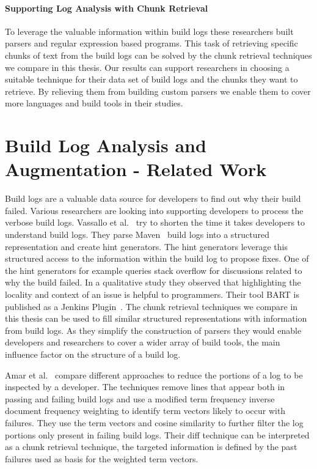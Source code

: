 \documentclass[\myrootdir/main.tex]{subfiles}
\begin{document}
\paragraph{Supporting Log Analysis with Chunk Retrieval}
To leverage the valuable information within build logs these researchers built parsers and regular expression based programs.
This task of retrieving specific chunks of text from the build logs can be solved by the chunk retrieval techniques we compare in this thesis.
Our results can support researchers in choosing a suitable technique for their data set of build logs and the chunks they want to retrieve.
By relieving them from building custom parsers we enable them to cover more languages and build tools in their studies.

\section{Build Log Analysis and Augmentation - Related Work}
\label{sec:rw-bl-analysis}
Build logs are a valuable data source for developers to find out why their build failed.
Various researchers are looking into supporting developers to process the verbose build logs.
Vassallo et al.~\cite{vassallo2018un-break} try to shorten the time it takes developers to understand build logs.
They parse Maven~\cite{maven2019website} build logs into a structured representation and create hint generators.
The hint generators leverage this structured access to the information within the build log to propose fixes.
One of the hint generators for example queries stack overflow for discussions related to why the build failed.
In a qualitative study they observed that highlighting the locality and context of an issue is helpful to programmers.
Their tool BART is published as a Jenkins Plugin~\cite{bart2019plugin}.
The chunk retrieval techniques we compare in this thesis can be used to fill similar structured representations with information from build logs.
As they simplify the construction of parsers they would enable developers and researchers to cover a wider array of build tools, the main influence factor on the structure of a build log.

Amar et al.~\cite{amar2019mining} compare different approaches to reduce the portions of a log to be inspected by a developer.
The techniques remove lines that appear both in passing and failing build logs and use a modified term frequency inverse document frequency weighting to identify term vectors likely to occur with failures.
They use the term vectors and cosine similarity to further filter the log portions only present in failing build logs.
Their diff technique can be interpreted as a chunk retrieval technique, the targeted information is defined by the past failures used as basis for the weighted term vectors.
\end{document}
